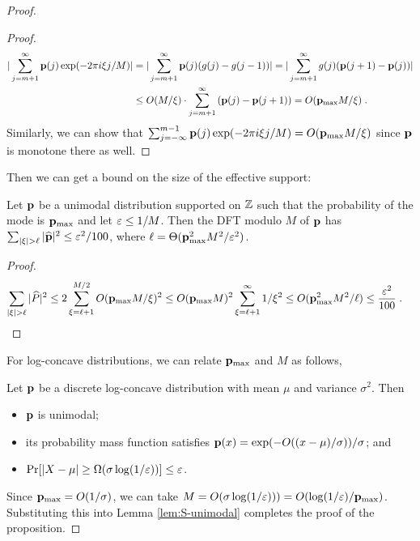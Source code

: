 \begin{proof}
\begin{proof}
\begin{align*}
|\sum_{j=m+1}^\infty \mathbf{p}(j) \exp(-2\pi i \xi j/M)| 
&= |\sum_{j=m+1}^\infty \mathbf{p}(j) (g(j)-g(j-1))| 
= |\sum_{j=m+1}^\infty g(j) (\mathbf{p}(j+1)-\mathbf{p}(j)) | \\
& \leq O(M/\xi) \cdot \sum_{j=m+1}^\infty \left( \mathbf{p}(j)- \mathbf{p}(j+1) \right)
 = O(\mathbf{p}_{\max}M/\xi) \;.
\end{align*}
Similarly, we can show that $\sum_{j=-\infty}^{m-1} \mathbf{p}(j) \exp(-2\pi i \xi j/M)= O(\mathbf{p}_{\max}M/\xi)$ since $\mathbf{p}$ is monotone there as well.
\end{proof}
\noindent Then we can get a bound on the size of the effective support:
\begin{lemma} \label{lem:S-unimodal}
Let $\mathbf{p}$ be a unimodal distribution supported on $\mathbb{Z}$ such that the probability of the mode is $\mathbf{p}_{\max}$ and let $\varepsilon \leq 1/M$. 
Then the DFT modulo $M$ of $\mathbf{p}$ has $\sum_{|\xi| > \ell} |\widehat{\mathbf{p}}|^2 \leq \varepsilon^2/100$, where $\ell= \Theta(\mathbf{p}_{\max}^2M^2/\varepsilon^2)$.
\end{lemma}
\begin{proof}
\begin{align*}
\sum_{|\xi| > \ell} |\widehat{P}|^2 & \leq 2\sum_{\xi=\ell+1}^{M/2} O(\mathbf{p}_{\max}M/\xi)^2 
 \leq O(\mathbf{p}_{\max}M)^2 \sum_{\xi=\ell+1}^\infty 1/\xi^2 
 \leq O(\mathbf{p}_{\max}^2M^2/\ell) \leq \frac{\varepsilon^2}{100} \;. 
\end{align*}
\end{proof}
For log-concave distributions, we can relate $\mathbf{p}_{\max}$ and $M$ as follows,
\begin{fact} \label{fact:log-concave-standard} 
Let $\mathbf{p}$ be a discrete log-concave distribution with mean $\mu$ and variance $\sigma^2$. 
Then 
\begin{itemize}
\item $\mathbf{p}$ is unimodal;
\item its probability mass function satisfies $\mathbf{p}(x)=\exp(-O((x-\mu)/\sigma))/\sigma$; and
\item $\Pr[|X-\mu| \geq \Omega(\sigma \log(1/\varepsilon))] \leq \varepsilon$.
\end{itemize}
\end{fact}
Since $\mathbf{p}_{\max}=O(1/\sigma)$, we can take $M=O(\sigma \log(1/\varepsilon)))=O(\log(1/\varepsilon)/\mathbf{p}_{\max})$. 
Substituting this into Lemma \ref{lem:S-unimodal} completes the proof of the proposition.
\end{proof}
 
